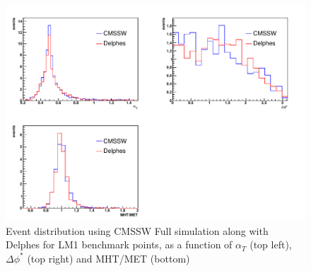 \begin{figure}[htbp]
\begin{center}
\includegraphics[height=9.cm]{figs/alphat.pdf} 
\caption{Event distribution using CMSSW Full simulation along with Delphes for LM1 benchmark points, 
as a function of $\alpha_{T}$ (top left), $\Delta \phi^{*}$ (top right) and MHT/MET (bottom)}
\label{fig:alphat}
\end{center}
\end{figure}

